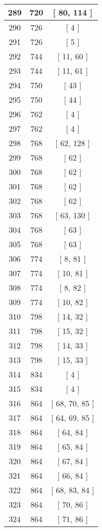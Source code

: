 \begin{center}
\begin{longtable}[H]{|| c c c ||}
\hline
289 & 720 & [ 80, 114 ] \\ 
\hline
290 & 726 & [ 4 ] \\ 
\hline
291 & 726 & [ 5 ] \\ 
\hline
292 & 744 & [ 11, 60 ] \\ 
\hline
293 & 744 & [ 11, 61 ] \\ 
\hline
294 & 750 & [ 43 ] \\ 
\hline
295 & 750 & [ 44 ] \\ 
\hline
296 & 762 & [ 4 ] \\ 
\hline
297 & 762 & [ 4 ] \\ 
\hline
298 & 768 & [ 62, 128 ] \\ 
\hline
299 & 768 & [ 62 ] \\ 
\hline
300 & 768 & [ 62 ] \\ 
\hline
301 & 768 & [ 62 ] \\ 
\hline
302 & 768 & [ 62 ] \\ 
\hline
303 & 768 & [ 63, 130 ] \\ 
\hline
304 & 768 & [ 63 ] \\ 
\hline
305 & 768 & [ 63 ] \\ 
\hline
306 & 774 & [ 8, 81 ] \\ 
\hline
307 & 774 & [ 10, 81 ] \\ 
\hline
308 & 774 & [ 8, 82 ] \\ 
\hline
309 & 774 & [ 10, 82 ] \\ 
\hline
310 & 798 & [ 14, 32 ] \\ 
\hline
311 & 798 & [ 15, 32 ] \\ 
\hline
312 & 798 & [ 14, 33 ] \\ 
\hline
313 & 798 & [ 15, 33 ] \\ 
\hline
314 & 834 & [ 4 ] \\ 
\hline
315 & 834 & [ 4 ] \\ 
\hline
316 & 864 & [ 68, 70, 85 ] \\ 
\hline
317 & 864 & [ 64, 69, 85 ] \\ 
\hline
318 & 864 & [ 64, 84 ] \\ 
\hline
319 & 864 & [ 65, 84 ] \\ 
\hline
320 & 864 & [ 67, 84 ] \\ 
\hline
321 & 864 & [ 66, 84 ] \\ 
\hline
322 & 864 & [ 68, 83, 84 ] \\ 
\hline
323 & 864 & [ 70, 86 ] \\ 
\hline
324 & 864 & [ 71, 86 ] \\ 

\end{longtable}
\end{center}
